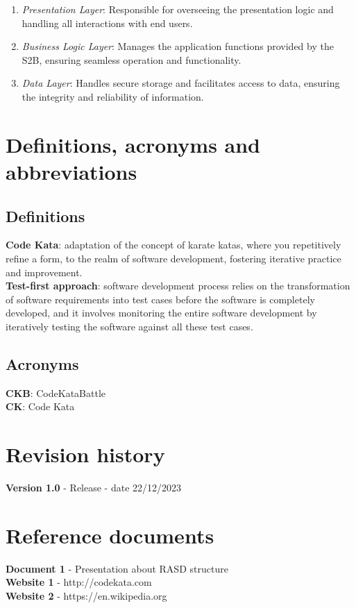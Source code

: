 \documentclass[12pt, a4paper]{report}
\begin{document}
        \begin{enumerate}
            \item \textit{Presentation Layer}: Responsible for overseeing the presentation logic and handling all interactions with end users.
            \item \textit{Business Logic Layer}: Manages the application functions provided by the S2B, ensuring seamless operation and functionality.
            \item \textit{Data Layer}: Handles secure storage and facilitates access to data, ensuring the integrity and reliability of information.
        \end{enumerate}

    \section{Definitions, acronyms and abbreviations}
    \subsection{Definitions}
    \textbf{Code Kata}: adaptation of the concept of karate katas, where you repetitively refine a form, to the realm of software development, 
        fostering iterative practice and improvement. 
    \\
    \textbf{Test-first approach}:  software development process relies on the transformation of software requirements into test cases before 
        the software is completely developed, and it involves monitoring the entire software development by iteratively testing the software 
        against all these test cases.
    \subsection{Acronyms}
    \textbf{CKB}: CodeKataBattle 
    \\
    \textbf{CK}: Code Kata
    

    \section{Revision history}
    \textbf{Version 1.0} - Release - date 22/12/2023


    \section{Reference documents}
    \textbf{Document 1} - Presentation about RASD structure
    \\
    \textbf{Website 1} - http://codekata.com
    \\
    \textbf{Website 2} - https://en.wikipedia.org
\end{document}

